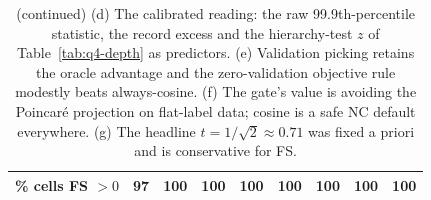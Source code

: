 \begin{table}[H]
\begin{tabular}{lcccccccc}
\% cells FS $>0$ & 97 & 100 & 100 & 100 & 100 & 100 & 100 & 100 \\
\bottomrule
\end{tabular}
\par\vspace{5pt}
\endgroup
\caption{(continued) (d) The calibrated reading: the raw 99.9th-percentile statistic, the record excess and the hierarchy-test $z$ of Table~\ref{tab:q4-depth} as predictors. (e) Validation picking retains the oracle advantage and the zero-validation objective rule modestly beats always-cosine. (f) The gate's value is avoiding the Poincar\'e projection on flat-label data; cosine is a safe NC default everywhere. (g) The headline $t=1/\sqrt2\approx0.71$ was fixed a priori and is conservative for FS. %
}
\end{table}

